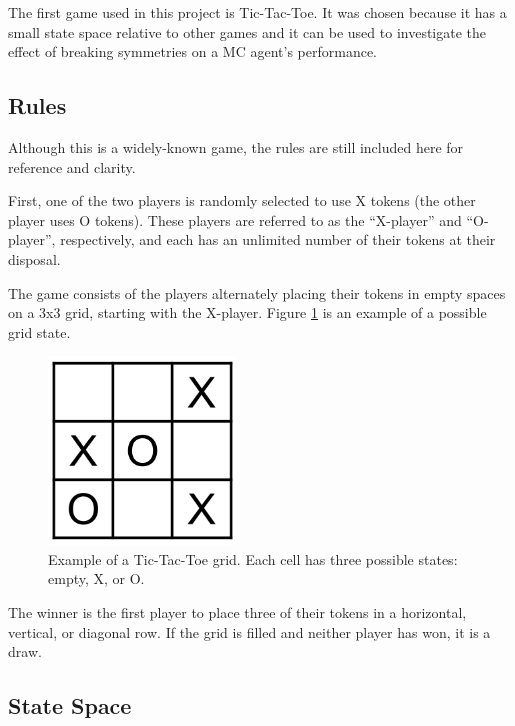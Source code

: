 \documentclass[11pt,a4paper]{report}
\begin{document}
The first game used in this project is Tic-Tac-Toe. It was chosen because it has a small state space relative to other games and it can be used to investigate the effect of breaking symmetries on a MC agent's performance.


\subsection{Rules}

Although this is a widely-known game, the rules \cite{tic-tac-toe-rules} are still included here for reference and clarity.

First, one of the two players is randomly selected to use X tokens (the other player uses O tokens). These players are referred to as the ``X-player'' and ``O-player'', respectively, and each has an unlimited number of their tokens at their disposal.

The game consists of the players alternately placing their tokens in empty spaces on a 3x3 grid, starting with the X-player. Figure \ref{tic-tac-toe-grid-example} is an example of a possible grid state.

\begin{figure}[htbp]
	\begin{center}
		\includegraphics[width=50mm]{tictactoe_grid_example.png}
		\caption{Example of a Tic-Tac-Toe grid. Each cell has three possible states: empty, X, or O.}
		\label{tic-tac-toe-grid-example}
	\end{center}
\end{figure}

The winner is the first player to place three of their tokens in a horizontal, vertical, or diagonal row. If the grid is filled and neither player has won, it is a draw.


\subsection{State Space}
\label{sec:TicTacToeStateSpace}
\end{document}
